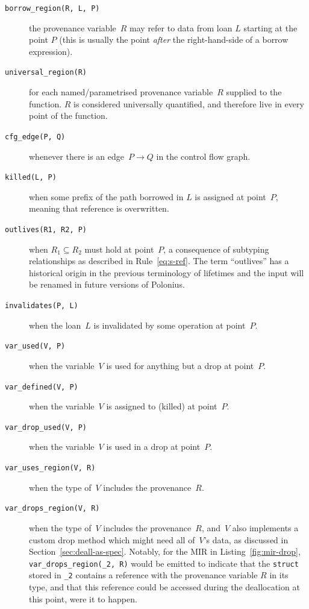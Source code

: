 \documentclass[11pt,a4paper,twoside,openany]{report}
\newcommand{\InRust}[1]{\texttt{#1}}
\newcommand{\InDatalog}[1]{\texttt{#1}}
\begin{document}
\begin{description}
\item[\InDatalog{borrow_region(R, L, P)}] the provenance variable~$R$ may refer
  to data from loan $L$ starting at the point $P$ (this is usually the point
  \emph{after} the right-hand-side of a borrow expression).
  
\item[\InDatalog{universal_region(R)}] for each named/parametrised provenance
  variable~$R$ supplied to the function. $R$ is considered universally
  quantified, and therefore live in every point of the function.
  
\item[\InDatalog{cfg_edge(P, Q)}] whenever there is an edge~$P \rightarrow Q$ in
  the control flow graph.
    
\item[\InDatalog{killed(L, P)}] when some prefix of the path borrowed in $L$ is
  assigned at point~$P$, meaning that reference is overwritten.
    
\item[\InDatalog{outlives(R1, R2, P)}] when $R_1 \subseteq R_2$ must hold at
  point~$P$, a consequence of subtyping relationships as described in
  Rule~\eqref{eq:s-ref}. The term ``outlives'' has a historical origin in the
  previous terminology of lifetimes and the input will be renamed in future
  versions of Polonius.
    
\item[\InDatalog{invalidates(P, L)}] when the loan~$L$ is invalidated by some
  operation at point~$P$.
    
\item[\InDatalog{var_used(V, P)}] when the variable~$V$ is used for anything but
  a drop at point~$P$.
    
\item[\InDatalog{var_defined(V, P)}] when the variable~$V$ is assigned to
  (killed) at point~$P$.
  
\item[\InDatalog{var_drop_used(V, P)}] when the variable~$V$ is used in a drop
  at point~$P$.

\item[\InDatalog{var_uses_region(V, R)}] when the type of~$V$ includes the
  provenance~$R$.

\item[\InDatalog{var_drops_region(V, R)}] when the type of~$V$ includes the
  provenance~$R$, and~$V$ also implements a custom drop method which might need
  all of~$V$'s data, as discussed in Section~\ref{sec:deall-as-spec}. Notably,
  for the MIR in Listing~\ref{fig:mir-drop}, \InDatalog{var_drops_region(_2, R)}
  would be emitted to indicate that the \InRust{struct} stored in \InRust{_2}
  contains a reference with the provenance variable $R$ in its type, and that
  this reference could be accessed during the deallocation at this point, were
  it to happen.


\end{description}
\end{document}
